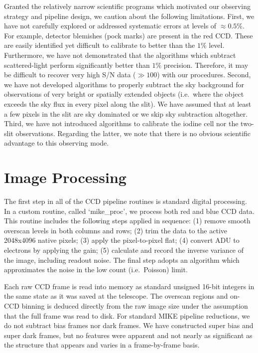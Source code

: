 \documentclass[12pt,preprint]{aastex}
\begin{document}
Granted the relatively narrow scientific programs which
motivated our observing strategy and pipeline design,
we caution about the following limitations.
First, we have not carefully explored or addressed 
systematic errors at levels of $\approx 0.5\%$.
For example, detector blemishes (pock marks) are present in 
the red CCD.  These are easily identified yet difficult to
calibrate to better than the $1\%$ level.  Furthermore,
we have not demonstrated that the algorithms which subtract
scattered-light perform significantly better than $1\%$ precision.
Therefore, it may be difficult to recover very high S/N data
($\gg 100$) with our procedures.
Second, we have not developed algorithms to properly subtract
the sky background for observations of very bright
or spatially extended objects (i.e.\ where the object 
exceeds the sky flux in every pixel along the slit).
We have assumed that at least a few pixels in the slit are
sky dominated or we skip sky subtraction altogether.
Third, we have not introduced algorithms to calibrate
the iodine cell nor the two-slit observations.
Regarding the latter, we note that there is no obvious
scientific advantage to this observing mode. 


\section{Image Processing}
\label{sec:proc}

The first step in all of the CCD pipeline routines is standard
digital processing.  In a custom routine, called `mike\_proc',
we process both red and blue CCD data. 
This routine includes the following steps applied in sequence:
(1) remove smooth overscan levels in both columns and rows;
(2) trim the data to the active 2048x4096 native pixels;
(3) apply the pixel-to-pixel flat; %
(4) convert ADU to electrons by applying the gain; 
(5) calculate and record the inverse variance of the image, 
including readout noise. 
The final step adopts an algorithm which 
approximates the noise in the low count (i.e.\ Poisson) limit.

Each raw CCD frame is read into memory as standard unsigned 16-bit integers 
in the same state as it was saved at the telescope.  The overscan regions
and on-CCD binning is deduced directly from the raw image size
under the assumption that the full frame was read to disk.
For standard MIKE pipeline reductions, we do not subtract bias frames nor
dark frames.  We have constructed super bias and super dark frames, but no
features were apparent and not nearly as significant as the structure that
appears and varies in a frame-by-frame basis.  
\end{document}
